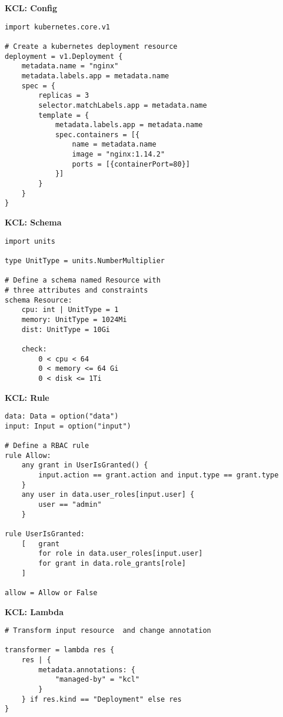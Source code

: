 \documentclass[10pt,landscape,a4paper]{article}
\newcommand{\API}[1]{\tikz[baseline=(X.base)]
  \node [fill=doccol, rectangle, inner sep=2pt,rounded corners=1pt] (X)
        {\href{#1}{\color{white}{\tiny \sffamily \textbf{DOC}}}};}
\newenvironment{myboxed}[1]
{\begin{mdframed}[linecolor=black,
                  backgroundcolor=white,
                  outerlinewidth=0.25pt,
                  innertopmargin=1ex,
                  topline=true,
                  rightline=true,
                  leftline=true,
                  bottomline=true,
                  linecolor=black!0,
                  frametitleaboveskip=0.5em,
                  frametitlebelowskip=0.5em,
                  innerbottommargin=.5\baselineskip,
                  innerrightmargin=.5em,
                  innerleftmargin=.5em,
                  frametitle={\footnotesize\color{secftcol}\RobotoSlab \bfseries \hspace*{0mm} #1},
                  frametitlebackgroundcolor=secbgcol,
                  frametitlerulewidth=2pt]}
{\end{mdframed}}
\begin{document}
\begin{multicols*}{5}
\begin{myboxed}{Concepts \hfill \API{https://kcl-lang.io/docs/user_docs/getting-started/intro}}
\textbf{KCL: Config}

\begin{lstlisting}
import kubernetes.core.v1

# Create a kubernetes deployment resource
deployment = v1.Deployment {
    metadata.name = "nginx"
    metadata.labels.app = metadata.name
    spec = {
        replicas = 3
        selector.matchLabels.app = metadata.name
        template = {
            metadata.labels.app = metadata.name
            spec.containers = [{
                name = metadata.name
                image = "nginx:1.14.2"
                ports = [{containerPort=80}]
            }]
        }
    }
}
\end{lstlisting}


\textbf{KCL: Schema}

\begin{lstlisting}
import units

type UnitType = units.NumberMultiplier

# Define a schema named Resource with
# three attributes and constraints
schema Resource:
    cpu: int | UnitType = 1
    memory: UnitType = 1024Mi
    dist: UnitType = 10Gi

    check:
        0 < cpu < 64
        0 < memory <= 64 Gi
        0 < disk <= 1Ti
\end{lstlisting}

\textbf{KCL: Rule}

\begin{lstlisting}
data: Data = option("data")
input: Input = option("input")

# Define a RBAC rule
rule Allow:
    any grant in UserIsGranted() {
        input.action == grant.action and input.type == grant.type
    }
    any user in data.user_roles[input.user] {
        user == "admin"
    }

rule UserIsGranted:
    [   grant 
        for role in data.user_roles[input.user]
        for grant in data.role_grants[role]
    ]

allow = Allow or False
\end{lstlisting}

\textbf{KCL: Lambda}

\begin{lstlisting}
# Transform input resource  and change annotation

transformer = lambda res {
    res | {
        metadata.annotations: {
            "managed-by" = "kcl"
        }
    } if res.kind == "Deployment" else res
}


\end{lstlisting}
\end{myboxed}
\end{multicols*}
\end{document}
